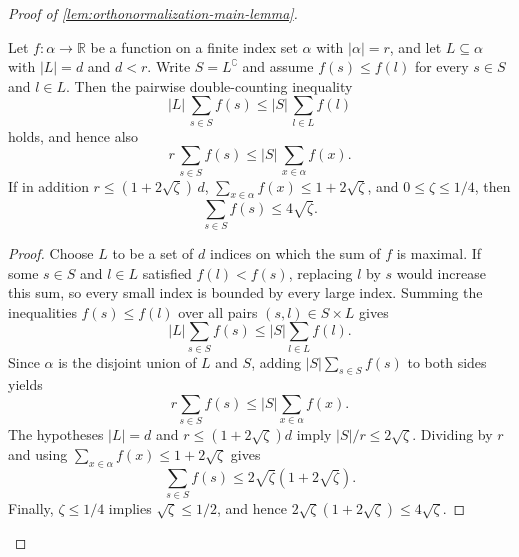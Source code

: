 \begin{proof}[Proof of \ref{lem:orthonormalization-main-lemma}]
	\begin{lemma}\label{lem:small-overlap-averaging}
		\leanok
		Let $f : \alpha \to \mathbb{R}$ be a function on a finite index set $\alpha$ with
		$|\alpha| = r$, and let $L \subseteq \alpha$ with $|L| = d$ and $d < r$. Write
		$S = L^\complement$ and assume $f(s) \leq f(l)$ for every $s \in S$ and $l \in L$.
		Then the pairwise double-counting inequality
		\[
			|L|\, \sum_{s \in S} f(s) \leq |S|\, \sum_{l \in L} f(l)
		\]
		holds, and hence also
		\[
			r\, \sum_{s \in S} f(s) \leq |S|\, \sum_{x \in \alpha} f(x).
		\]
		If in addition $r \leq (1+2\sqrt{\zeta})\,d$, $\sum_{x \in \alpha} f(x) \leq
		1 + 2\sqrt{\zeta}$, and $0 \leq \zeta \leq 1/4$, then
		\[
			\sum_{s \in S} f(s) \leq 4\sqrt{\zeta}.
		\]
	\end{lemma}
	\begin{proof}
		\leanok
		Choose $L$ to be a set of $d$ indices on which the sum of $f$ is maximal. If some $s \in S$ and $l \in L$ satisfied $f(l) < f(s)$, replacing $l$ by $s$ would increase this sum, so every small index is bounded by every large index. Summing the inequalities $f(s) \leq f(l)$ over all pairs $(s,l) \in S \times L$ gives
		\[
			|L|\sum_{s \in S} f(s) \leq |S|\sum_{l \in L} f(l).
		\]
		Since $\alpha$ is the disjoint union of $L$ and $S$, adding $|S|\sum_{s \in S} f(s)$ to both sides yields
		\[
			r\sum_{s \in S} f(s) \leq |S|\sum_{x \in \alpha} f(x).
		\]
		The hypotheses $|L|=d$ and $r \leq (1+2\sqrt{\zeta})d$ imply $|S|/r \leq 2\sqrt{\zeta}$. Dividing by $r$ and using $\sum_{x \in \alpha} f(x) \leq 1+2\sqrt{\zeta}$ gives
		\[
			\sum_{s \in S} f(s) \leq 2\sqrt{\zeta}(1+2\sqrt{\zeta}).
		\]
		Finally, $\zeta \leq 1/4$ implies $\sqrt{\zeta} \leq 1/2$, and hence $2\sqrt{\zeta}(1+2\sqrt{\zeta}) \leq 4\sqrt{\zeta}$.
	\end{proof}



\end{proof}
